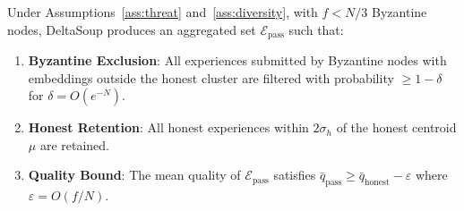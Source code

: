 \begin{theorem}
\label{thm:deltasoup-robust}
Under Assumptions~\ref{ass:threat} and~\ref{ass:diversity}, with $f < N/3$
Byzantine nodes, DeltaSoup produces an aggregated set $\mathcal{E}_{\text{pass}}$
such that:
\begin{enumerate}[leftmargin=1.5em]
    \item \textbf{Byzantine Exclusion}: All experiences submitted by Byzantine
          nodes with embeddings outside the honest cluster are filtered with
          probability $\geq 1 - \delta$ for $\delta = O(e^{-N})$.
    \item \textbf{Honest Retention}: All honest experiences within $2\sigma_h$
          of the honest centroid $\mu$ are retained.
    \item \textbf{Quality Bound}: The mean quality of $\mathcal{E}_{\text{pass}}$
          satisfies $\bar{q}_{\text{pass}} \geq \bar{q}_{\text{honest}} - \varepsilon$
          where $\varepsilon = O(f/N)$.
\end{enumerate}
\end{theorem}


